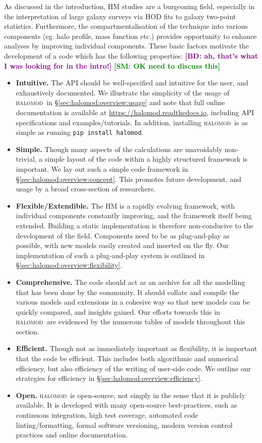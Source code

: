\documentclass[5p]{elsarticle}
\newcommand{\halomod}{\textsc{halomod}}
\newcommand{\bd}[1]{\textcolor{purple}{\textbf{[BD: #1]}}}
\newcommand{\sgm}[1]{\textcolor{green}{\textbf{[SM: #1]}}}
\begin{document}
As discussed in the introduction, HM studies are a burgeoning field, especially in the interpretation of large galaxy surveys via HOD fits to galaxy two-point statistics. Furthermore, the compartmentalisation of the technique into various components (eg. halo profile, mass function etc.) provides opportunity to enhance analyses by improving individual components. These basic factors motivate the development of a code which has the following properties: \bd{ah, that's what I was looking for in the intro!} \sgm{OK need to discuss this}
\begin{itemize}
    \item \textbf{Intuitive.}  The API should be well-specified and intuitive for the user, and exhaustively documented. We illustrate the simplicity of the usage of \halomod\ in \S\ref{sec:halomod:overview:usage} and note that full online documentation is available at \url{https://halomod.readthedocs.io}, including API specifications and examples/tutorials. In addition, installing \halomod\ is as simple as running \verb|pip install halomod|.
    \item \textbf{Simple.} Though many aspects of the calculations are unavoidably non-trivial, a simple layout of the code within a highly structured framework is important. We lay out such a simple code framework in \S\ref{sec:halomod:overview:concept}. This promotes future development, and usage by a broad cross-section of researchers. 
    \item \textbf{Flexible/Extendible. } The HM is a rapidly evolving framework, with individual components constantly improving, and the framework itself being extended. Building a static implementation is therefore non-conducive  to the development of the field. Components need to be as plug-and-play as possible, with new models easily created and inserted on the fly. Our implementation of 
    such a plug-and-play system is outlined in \S\ref{sec:halomod:overview:flexibility}.
    \item \textbf{Comprehensive. } The code should act as an archive for all the modelling that has been done by the community. It should collate and compile the various models and extensions in a cohesive way so that new models can be quickly compared, and insights gained. Our efforts towards this in \halomod\ are evidenced by the numerous tables of models throughout this section.
    \item \textbf{Efficient. } Though not as immediately important as flexibility, it is important that the code be efficient. This includes both algorithmic and numerical efficiency, but also efficiency of the writing of user-side code.
    We outline our strategies for efficiency in \S\ref{sec:halomod:overview:efficiency}.
    \item \textbf{Open. } \halomod\ is open-source, not simply in the sense that it is publicly available. It is developed with many open-source best-practices, such as continuous integration, high test coverage, automated code linting/formatting, formal software versioning, modern version control practices and online documentation. 
\end{itemize}
\end{document}
